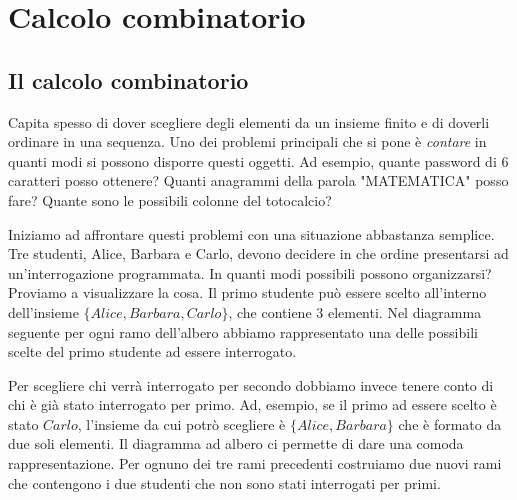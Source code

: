
\chapter{Calcolo combinatorio}

\section{Il calcolo combinatorio}
\label{sec:01_introduzione}
Capita spesso di dover scegliere degli elementi da un insieme finito e di 
doverli ordinare in una sequenza. Uno dei problemi principali che si pone è 
\emph{contare} in quanti modi si possono disporre questi oggetti. Ad esempio, 
quante password di 6 caratteri posso ottenere? Quanti anagrammi della parola 
"MATEMATICA" posso fare? Quante sono le possibili colonne del totocalcio?

Iniziamo ad affrontare questi problemi con una situazione abbastanza semplice. 
Tre studenti, Alice, Barbara e Carlo, devono decidere in che ordine presentarsi 
ad un'interrogazione programmata.
In quanti modi possibili possono organizzarsi?
Proviamo a visualizzare la cosa. Il primo studente può essere scelto 
all'interno dell'insieme $\{Alice,Barbara,Carlo\}$, che contiene 3 elementi. Nel 
diagramma seguente per ogni ramo dell'albero abbiamo rappresentato una delle 
possibili scelte del primo studente ad essere interrogato.

\vspace{-6pt}
\begin{center}
\end{center}

\vspace{-6pt}
Per scegliere chi verrà interrogato per secondo dobbiamo invece tenere conto di 
chi è già stato interrogato per primo. Ad, esempio, se il primo ad essere 
scelto è stato $Carlo$, l'insieme da cui potrò scegliere è $\{Alice, Barbara\}$ 
che è formato da due soli elementi. Il diagramma ad albero ci permette di dare 
una comoda rappresentazione. Per ognuno dei tre rami precedenti costruiamo due 
nuovi rami che contengono i due studenti che non sono stati interrogati per 
primi.

